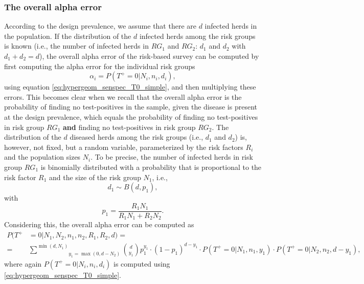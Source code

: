 \documentclass[nojss]{jss}
\begin{document}

\subsubsection{The overall alpha error}

According to the design prevalence, we assume that there are $d$ infected herds in the population. If the distribution of the $d$ infected herds among the risk groups is known (i.e., the number of infected herds in $RG_1$ and $RG_2$: $d_1$ and $d_2$ with $d_1+d_2 = d$), the overall alpha error of the risk-based survey can be computed by first computing the alpha error for the individual risk groups
$$
\alpha_i = P(T^+=0 | N_i, n_i, d_i),
$$
using equation \eqref{eq:hypergeom_senspec_T0_simple}, and then multiplying these errors. This becomes clear when we recall that the overall alpha error is the probability of finding no test-positives in the sample, given the disease is present at the design prevalence, which equals the probability of finding no test-positives in risk group $RG_1$ \textbf{and} finding no test-positives in risk group $RG_2$. The distribution of the $d$ diseased herds among the risk groups (i.e., $d_1$ and $d_2$) is, however, not fixed, but a random variable, parameterized by the risk factors $R_i$ and the population sizes $N_i$. To be precise, the number of infected herds in risk group $RG_1$ is binomially distributed with a probability that is proportional to the risk factor $R_1$ and the size of the risk group $N_1$, i.e.,
%
$$d_1 \sim B(d,p_1),$$
%
with
%
\begin{equation}
\label{eq:riskProbability}
p_1 = \frac{R_1N_1}{R_1N_1+R_2N_2}.
\end{equation}
%
Considering this, the overall alpha error can be computed as
%
\begin{align*}
%
P(T^+&=0 | N_1, N_2, n_1, n_2, R_1, R_2, d) = \\
= & \underset{y_1 = \max(0,d-N_2)}{\overset{\min(d,N_1)}{\sum}} {d \choose y_1} p_1^{y_1} \cdot (1-p_1 )^{d-y_1} \cdot
P(T^+=0| N_1,n_1,y_1) \cdot P(T^+=0| N_2,n_2,d-y_1),
%
\end{align*}
%
where again $P(T^+=0| N_i,n_i,d_i)$ is computed using \eqref{eq:hypergeom_senspec_T0_simple}.
\end{document}
